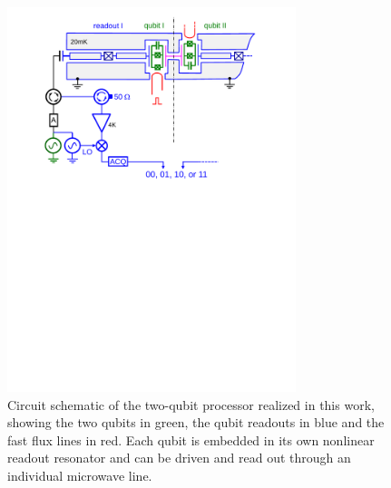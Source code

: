 \begin{figure}[ht!]
	\centering
		\includegraphics[width=0.75\textwidth]{./material/papers/grover/figures/2_qubit_processor_schematic}
	\caption[Circuit schematic of the realized two-qubit processor]{Circuit schematic of the two-qubit processor realized in this work, showing the two qubits in green, the qubit readouts in blue and the fast flux lines in red. Each qubit is embedded in its own nonlinear readout resonator and can be driven and read out through an individual microwave line.}
	\label{fig:two_qubit_processor_schematic}
\end{figure}


